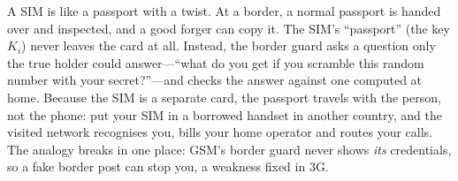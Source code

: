 \begin{analogy}
A SIM is like a passport with a twist. At a border, a normal passport is handed over and inspected,
and a good forger can copy it. The SIM's ``passport'' (the key $K_i$) never leaves the card at all.
Instead, the border guard asks a question only the true holder could answer---``what do you get if
you scramble this random number with your secret?''---and checks the answer against one computed at
home. Because the SIM is a separate card, the passport travels with the person, not the phone: put
your SIM in a borrowed handset in another country, and the visited network recognises you, bills
your home operator and routes your calls. The analogy breaks in one place: GSM's border guard never
shows \emph{its} credentials, so a fake border post can stop you, a weakness fixed in 3G.
\end{analogy}

